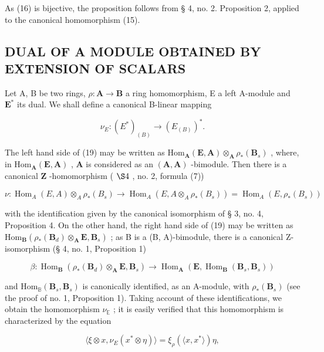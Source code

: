 As (16) is bijective, the proposition follows from § 4, no. 2. Proposition 2, applied to the canonical homomorphism (15).

\subsection{DUAL OF A MODULE OBTAINED BY EXTENSION OF SCALARS}

Let A, B be two rings, \(\rho: \mathbf{A} \to \mathbf{B}\) a ring homomorphism, E a left A-module and \(\mathbf{E}^*\) its dual. We shall define a canonical B-linear mapping

\[
\nu _ {E}: (E ^ {*}) _ {(B)} \rightarrow (E _ {(B)}) ^ {*}.\tag{19}
\]

The left hand side of (19) may be written as \(\mathrm{Hom}_{\mathbf{A}}(\mathbf{E},\mathbf{A})\otimes_{\mathbf{A}}\rho_{*}(\mathbf{B}_{s})\) , where, in \(\mathrm{Hom}_{\mathbf{A}}(\mathbf{E},\mathbf{A})\) , \(\mathbf{A}\) is considered as an \((\mathbf{A},\mathbf{A})\) -bimodule. Then there is a canonical \(\mathbf{Z}\) -homomorphism ( \(\S 4\) , no. 2, formula (7))

\[
\nu: \operatorname{Hom} _ {A} (E, A) \otimes_ {A} \rho_ {*} (B _ {s}) \rightarrow \operatorname{Hom} _ {A} (E, A \otimes_ {A} \rho_ {*} (B _ {s})) = \operatorname{Hom} _ {A} (E, \rho_ {*} (B _ {s}))
\]

with the identification given by the canonical isomorphism of § 3, no. 4, Proposition 4. On the other hand, the right hand side of (19) may be written as \(\mathrm{Hom}_{\mathbf{B}}(\rho_{*}(\mathbf{B}_{d}) \otimes_{\mathbf{A}} \mathbf{E}, \mathbf{B}_{s})\) ; as B is a (B, A)-bimodule, there is a canonical Z-isomorphism (§ 4, no. 1, Proposition 1)

\[
\beta : \operatorname{Hom} _ {\mathbf {B}} (\rho_ {*} (\mathbf {B} _ {d}) \otimes_ {\mathbf {A}} \mathbf {E}, \mathbf {B} _ {s}) \rightarrow \operatorname{Hom} _ {\mathbf {A}} (\mathbf {E}, \operatorname{Hom} _ {\mathbf {B}} (\mathbf {B} _ {s}, \mathbf {B} _ {s}))
\]

and \(\mathrm{Hom}_{\mathbb{B}}(\mathbf{B}_s,\mathbf{B}_s)\) is canonically identified, as an A-module, with \(\rho_{*}(\mathbf{B}_{s})\) (see the proof of no. 1, Proposition 1). Taking account of these identifications, we obtain the homomorphism \(\nu_{\mathbb{E}}\) ; it is easily verified that this homomorphism is characterized by the equation

\[
\langle \xi \otimes x, \nu _ {E} (x ^ {*} \otimes \eta) \rangle = \xi_ {\rho} (\langle x, x ^ {*} \rangle) \eta ,\tag{20}
\]

